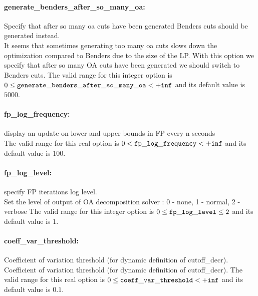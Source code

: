 \paragraph{generate\_benders\_after\_so\_many\_oa:}\label{sec:generate_benders_after_so_many_oa} Specify that after so many oa cuts have been generated Benders cuts should be generated instead. $\;$ \\
 It seems that sometimes generating too many oa
cuts slows down the optimization compared to
Benders due to the size of the LP. With this
option we specify that after so many OA cuts have
been generated we should switch to Benders cuts. The valid range for this integer option is
$0 \le {\tt generate\_benders\_after\_so\_many\_oa } <  {\tt +inf}$
and its default value is $5000$.


\paragraph{fp\_log\_frequency:}\label{sec:fp_log_frequency} display an update on lower and upper bounds in FP every n seconds $\;$ \\
 The valid range for this real option is 
$0 <  {\tt fp\_log\_frequency } <  {\tt +inf}$
and its default value is $100$.


\paragraph{fp\_log\_level:}\label{sec:fp_log_level} specify FP iterations log level. $\;$ \\
 Set the level of output of OA decomposition
solver : 0 - none, 1 - normal, 2 - verbose The valid range for this integer option is
$0 \le {\tt fp\_log\_level } \le 2$
and its default value is $1$.


\paragraph{coeff\_var\_threshold:}\label{sec:coeff_var_threshold} Coefficient of variation threshold (for dynamic definition of cutoff\_decr). $\;$ \\
 Coefficient of variation threshold (for dynamic
definition of cutoff\_decr). The valid range for this real option is 
$0 \le {\tt coeff\_var\_threshold } <  {\tt +inf}$
and its default value is $0.1$.


